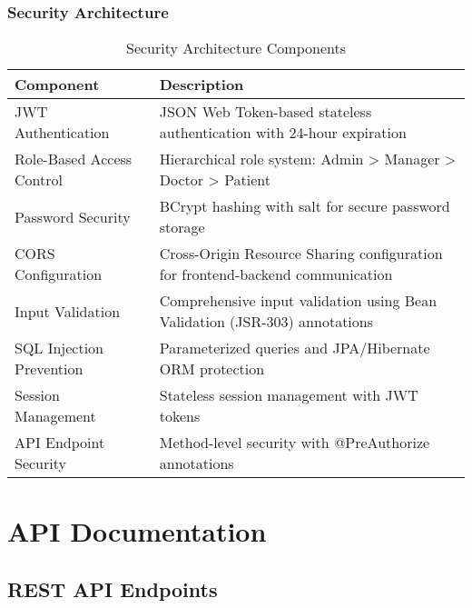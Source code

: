 \documentclass[12pt,a4paper]{article}
\begin{document}
\subsubsection{Security Architecture}

\begin{table}[H]
\centering
\caption{Security Architecture Components}
\label{tab:security-architecture}
\begin{tabularx}{\textwidth}{|l|X|}
\hline
\textbf{Component} & \textbf{Description} \\
\hline
JWT Authentication & JSON Web Token-based stateless authentication with 24-hour expiration \\
\hline
Role-Based Access Control & Hierarchical role system: Admin > Manager > Doctor > Patient \\
\hline
Password Security & BCrypt hashing with salt for secure password storage \\
\hline
CORS Configuration & Cross-Origin Resource Sharing configuration for frontend-backend communication \\
\hline
Input Validation & Comprehensive input validation using Bean Validation (JSR-303) annotations \\
\hline
SQL Injection Prevention & Parameterized queries and JPA/Hibernate ORM protection \\
\hline
Session Management & Stateless session management with JWT tokens \\
\hline
API Endpoint Security & Method-level security with @PreAuthorize annotations \\
\hline
\end{tabularx}
\end{table}

\section{API Documentation}

\subsection{REST API Endpoints}
\end{document}
